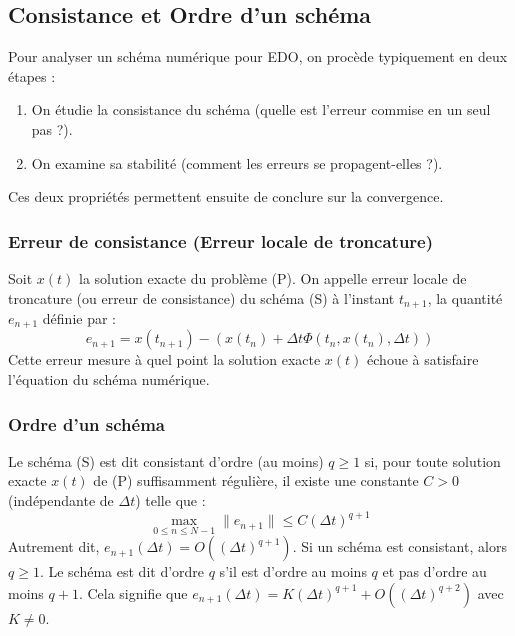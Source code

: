 \subsection{Consistance et Ordre d'un schéma}
\begin{remark}
Pour analyser un schéma numérique pour EDO, on procède typiquement en deux étapes :
\begin{enumerate}
    \item On étudie la consistance du schéma (quelle est l'erreur commise en un seul pas ?).
    \item On examine sa stabilité (comment les erreurs se propagent-elles ?).
\end{enumerate}
Ces deux propriétés permettent ensuite de conclure sur la convergence.
\end{remark}

\subsubsection{Erreur de consistance (Erreur locale de troncature)}
\begin{definition}
Soit $x(t)$ la solution exacte du problème (P). On appelle erreur locale de troncature (ou erreur de consistance) du schéma (S) à l'instant $t_{n+1}$, la quantité $e_{n+1}$ définie par :
\[
e_{n+1} = x(t_{n+1}) - \left( x(t_n) + \Delta t \Phi(t_n, x(t_n), \Delta t) \right)
\]
Cette erreur mesure à quel point la solution exacte $x(t)$ échoue à satisfaire l'équation du schéma numérique.
\end{definition}

\subsubsection{Ordre d'un schéma}
\begin{definition}
Le schéma (S) est dit consistant d'ordre (au moins) $q \ge 1$ si, pour toute solution exacte $x(t)$ de (P) suffisamment régulière, il existe une constante $C > 0$ (indépendante de $\Delta t$) telle que :
\[
\max_{0 \le n \le N-1} \|e_{n+1}\| \le C (\Delta t)^{q+1}
\]
Autrement dit, $e_{n+1}(\Delta t) = O((\Delta t)^{q+1})$.
Si un schéma est consistant, alors $q \ge 1$. Le schéma est dit d'ordre $q$ s'il est d'ordre au moins $q$ et pas d'ordre au moins $q+1$. Cela signifie que $e_{n+1}(\Delta t) = K (\Delta t)^{q+1} + O((\Delta t)^{q+2})$ avec $K \neq 0$.
\end{definition}

